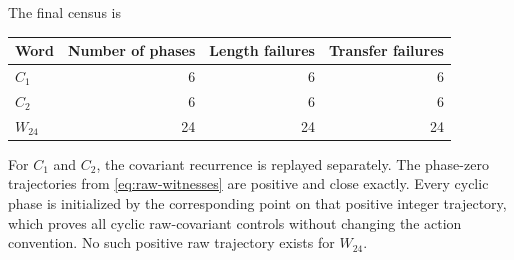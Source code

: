 The final census is
\begin{center}
\begin{tabular}{@{}lrrr@{}}
\toprule
Word & Number of phases & Length failures & Transfer failures \\
\midrule
$C_1$ & 6 & 6 & 6 \\
$C_2$ & 6 & 6 & 6 \\
$W_{24}$ & 24 & 24 & 24 \\
\bottomrule
\end{tabular}
\end{center}

For $C_1$ and $C_2$, the covariant recurrence is replayed separately.  The
phase-zero trajectories from \eqref{eq:raw-witnesses} are positive and close
exactly.  Every cyclic phase is initialized by the corresponding point on
that positive integer trajectory, which proves all cyclic raw-covariant
controls without changing the action convention.  No such positive raw
trajectory exists for $W_{24}$.

